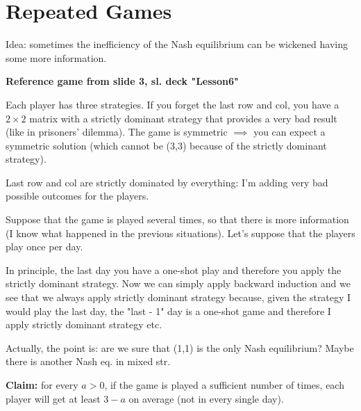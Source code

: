 
%



\section{Repeated Games}

\bigskip
\noindent Idea: sometimes the inefficiency of the Nash equilibrium can be 
wickened having some more information.

\bigskip
\noindent \textbf{Reference game from slide 3, sl. deck "Lesson6"}

\noindent Each player has three strategies. If you forget the last row and col, 
you have a $2 \times 2$ matrix with a strictly dominant strategy that 
provides a very bad result (like in prisoners' dilemma). The game is symmetric 
$\implies$ you can expect a symmetric solution (which cannot be (3,3) because 
of the strictly dominant strategy).

\noindent Last row and col are strictly dominated by everything: I'm adding 
very bad possible outcomes for the players.

\noindent Suppose that the game is played several times, so that there is more 
information (I know what happened in the previous situations). Let's suppose 
that the players play once per day.

\noindent In principle, the last day you have a one-shot play and therefore 
you apply the strictly dominant strategy. Now we can simply apply backward 
induction and we see that we always apply strictly dominant strategy because, 
given the strategy I would play the last day, the "last - 1" day is a 
one-shot game and therefore I apply strictly dominant strategy etc.

\noindent Actually, the point is: are we sure that (1,1) is the only Nash 
equilibrium? Maybe there is another Nash eq. in mixed str.

\bigskip
\noindent \textbf{Claim:} for every $a > 0$, if the game is played a sufficient number of times, each player will get at least $3-a$ on average (not in every single day). 

